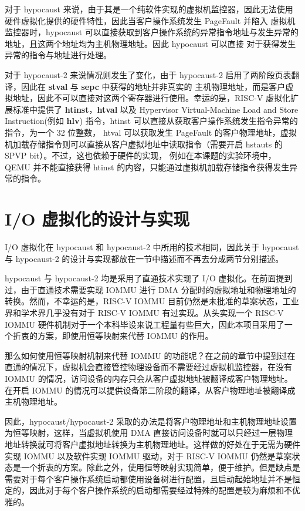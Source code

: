 对于 hypocaust 来说，由于其是一个纯软件实现的虚拟机监控器，因此无法使用硬件虚拟化提供的硬件特性，因此当客户操作系统发生 PageFault 并陷入 
虚拟机监控器时，hypocaust 可以直接获取到客户操作系统的异常指令地址与发生异常的地址，且这两个地址均为主机物理地址。因此 hypocaust 可以直接
对于获得发生异常的指令与地址进行处理。

对于 hypocaust-2 来说情况则发生了变化，由于 hypocaust-2 启用了两阶段页表翻译，因此在 \textbf{stval} 与 \textbf{sepc} 中获得的地址并非真实的
主机物理地址，而是客户虚拟地址，因此不可以直接对这两个寄存器进行使用。幸运的是，RISC-V 虚拟化扩展标准中提供了 \textbf{htinst}，\textbf{htval} 以及
Hypervisor Virtual-Machine Load and Store Instruction(例如 \textbf{hlv}) 指令，htinst 可以直接从获取客户操作系统发生指令异常的指令，为一个 32 位整数，
htval 可以获取发生 PageFault 的客户物理地址，虚拟机加载存储指令则可以直接从客户虚拟地址中读取指令（需要开启 hstauts 的 SPVP bit）。不过，这也依赖于硬件的实现，
例如在本课题的实验环境中，QEMU 并不能直接获得 htinst 的内容，只能通过虚拟机加载存储指令获得发生异常的指令。

\section{I/O 虚拟化的设计与实现}
I/O 虚拟化在 hypocaust 和 hypocaust-2 中所用的技术相同，因此关于 hypocaust 与 hypocaust-2 的设计与实现都放在一节中描述而不再去分成两节分别描述。

hypocaust 与 hypocaust-2 均是采用了直通技术实现了 I/O 虚拟化。在前面提到过，由于直通技术需要实现 IOMMU 进行 DMA 分配时的虚拟地址和物理地址的转换。然而，不幸运的是，RISC-V IOMMU 目前仍然是未批准的草案状态，工业界和学术界几乎没有对于 RISC-V IOMMU 有过实现。从头实现一个 RISC-V IOMMU 硬件机制对于一个本科毕设来说工程量有些巨大，因此本项目采用了一个折衷的方案，即使用恒等映射来代替 IOMMU 的作用。

那么如何使用恒等映射机制来代替 IOMMU 的功能呢？在之前的章节中提到过在直通的情况下，虚拟机会直接管控物理设备而不需要经过虚拟机监控器，在没有 IOMMU 的情况，访问设备的内存只会从客户虚拟地址被翻译成客户物理地址。在开启 IOMMU 的情况可以提供设备第二阶段的翻译，从客户物理地址被翻译成主机物理地址。

因此，hypocaust/hypocaust-2 采取的办法是将客户物理地址和主机物理地址设置为恒等映射，这样，当虚拟机使用 DMA 直接访问设备时就可以只经过一层物理地址转换就可将客户虚拟地址转换为主机物理地址。这样做的好处在于无需为硬件实现 IOMMU 以及软件实现 IOMMU 驱动，对于 RISC-V IOMMU 仍然是草案状态是一个折衷的方案。除此之外，使用恒等映射实现简单，便于维护。但是缺点是需要对于每个客户操作系统启动都使用设备树进行配置，且启动起始地址并不是恒定的，因此对于每个客户操作系统的启动都需要经过特殊的配置是较为麻烦和不优雅的。

